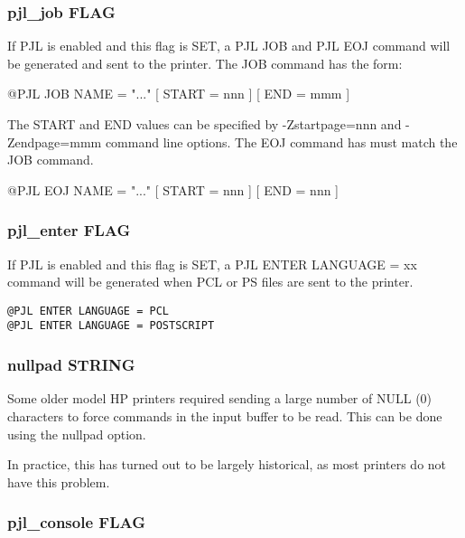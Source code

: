 \documentclass[a4paper]{article}
\begin{document}
\subsubsection{pjl\_job FLAG
\label{pjl_job}}

If PJL is enabled and this flag is SET,
a PJL JOB and PJL EOJ command will be generated
and sent to the printer.
The JOB command has the form:
\begin{tscreen}
@PJL JOB NAME = "..." {[} START = nnn {]} {[} END = mmm {]}
\end{tscreen}

The START and END values can be specified by
{\ttfamily -Zstartpage=nnn}
and
{\ttfamily -Zendpage=mmm}
command line options.
The EOJ command has must match the JOB command.
\begin{tscreen}
@PJL EOJ NAME = "..." {[} START = nnn {]} {[} END = nnn {]}
\end{tscreen}



\subsubsection{pjl\_enter FLAG
\label{pjl_enter}}

If PJL is enabled and this flag is SET,
a PJL ENTER LANGUAGE = xx command will be generated
when PCL or PS files are sent to the printer.
\begin{tscreen}
\begin{verbatim}
@PJL ENTER LANGUAGE = PCL
@PJL ENTER LANGUAGE = POSTSCRIPT
\end{verbatim}
\end{tscreen}



\subsubsection{nullpad STRING
\label{nullpad}}

Some older model HP printers required sending a large number of
NULL (0) characters to force commands in the input buffer to be read.
This can be done using the
{\ttfamily nullpad} option.

In practice,
this has turned out to be largely historical,
as most printers do not have this problem.


\subsubsection{pjl\_console FLAG
\label{pjl_console}}
\end{document}
